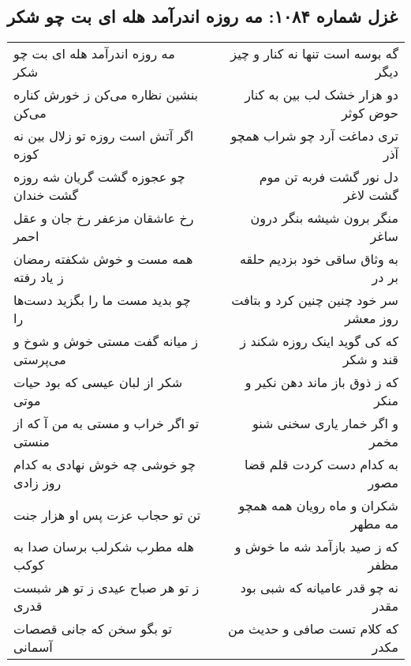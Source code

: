 \begin{center}
\section*{غزل شماره ۱۰۸۴: مه روزه اندرآمد هله ای بت چو شکر}
\label{sec:1084}
\begin{longtable}{l p{0.5cm} r}
مه روزه اندرآمد هله ای بت چو شکر
&&
گه بوسه است تنها نه کنار و چیز دیگر
\\
بنشین نظاره می‌کن ز خورش کناره می‌کن
&&
دو هزار خشک لب بین به کنار حوض کوثر
\\
اگر آتش است روزه تو زلال بین نه کوزه
&&
تری دماغت آرد چو شراب همچو آذر
\\
چو عجوزه گشت گریان شه روزه گشت خندان
&&
دل نور گشت فربه تن موم گشت لاغر
\\
رخ عاشقان مزعفر رخ جان و عقل احمر
&&
منگر برون شیشه بنگر درون ساغر
\\
همه مست و خوش شکفته رمضان ز یاد رفته
&&
به وثاق ساقی خود بزدیم حلقه بر در
\\
چو بدید مست ما را بگزید دست‌ها را
&&
سر خود چنین چنین کرد و بتافت روز معشر
\\
ز میانه گفت مستی خوش و شوخ و می‌پرستی
&&
که کی گوید اینک روزه شکند ز قند و شکر
\\
شکر از لبان عیسی که بود حیات موتی
&&
که ز ذوق باز ماند دهن نکیر و منکر
\\
تو اگر خراب و مستی به من آ که از منستی
&&
و اگر خمار یاری سخنی شنو مخمر
\\
چو خوشی چه خوش نهادی به کدام روز زادی
&&
به کدام دست کردت قلم قضا مصور
\\
تن تو حجاب عزت پس او هزار جنت
&&
شکران و ماه رویان همه همچو مه مطهر
\\
هله مطرب شکرلب برسان صدا به کوکب
&&
که ز صید بازآمد شه ما خوش و مظفر
\\
ز تو هر صباح عیدی ز تو هر شبست قدری
&&
نه چو قدر عامیانه که شبی بود مقدر
\\
تو بگو سخن که جانی قصصات آسمانی
&&
که کلام تست صافی و حدیث من مکدر
\\
\end{longtable}
\end{center}
